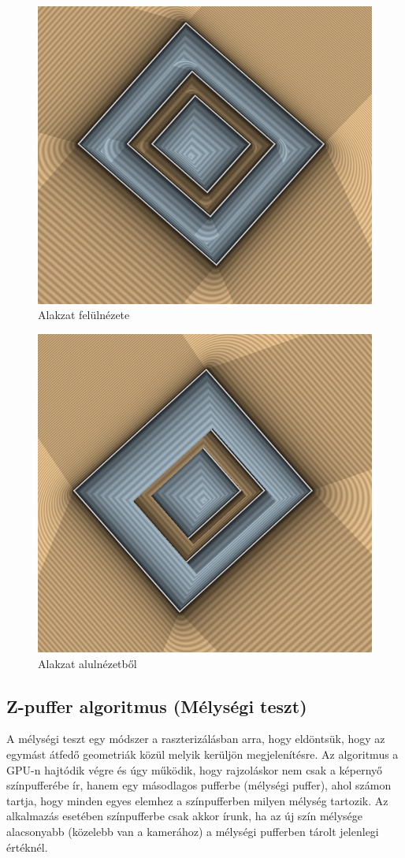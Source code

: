 \begin{figure}[H]
	\centering
	\includegraphics[width=.6\linewidth]{images/algorithm_output_top_down.png}
	\caption{Alakzat felülnézete}
	\label{fig:algorithm_output_top_down-1}
\end{figure}
\begin{figure}[H]
	\centering
	\includegraphics[width=.6\linewidth]{images/algorithm_output_bottom_up.png}
	\caption{Alakzat alulnézetből}
	\label{fig:algorithm_output_bottom_up-1}
\end{figure}

\subsection{Z-puffer algoritmus (Mélységi teszt)}
A mélységi teszt egy módszer a raszterizálásban arra, hogy eldöntsük, hogy az egymást átfedő geometriák közül melyik kerüljön megjelenítésre. Az algoritmus a GPU-n hajtódik végre és úgy működik, hogy rajzoláskor nem csak a képernyő színpufferébe ír, hanem egy másodlagos pufferbe (mélységi puffer), ahol számon tartja, hogy minden egyes elemhez a színpufferben milyen mélység tartozik. Az alkalmazás esetében színpufferbe csak akkor írunk, ha az új szín mélysége alacsonyabb (közelebb van a kamerához) a mélységi pufferben tárolt jelenlegi értéknél.


